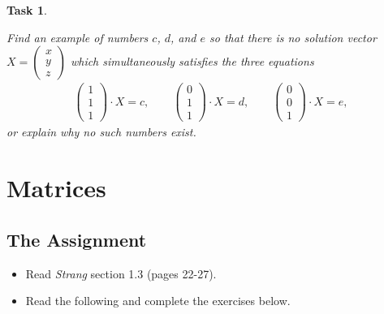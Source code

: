 \documentclass[10pt,]{book}
\theoremstyle{plain}
\numberwithin{equation}{section}
\newtheorem{task}{Task}[chapter]
\begin{document}
\begin{task}
\label{task-22}

        Find an example of numbers \(c\), \(d\), and \(e\) so that there
        is no solution vector \(X = \left(\begin{smallmatrix}x\\y\\z
        \end{smallmatrix}\right)\) which simultaneously satisfies the three
        equations \begin{gather*}
\begin{pmatrix} 1\\1\\1\end{pmatrix}\cdot X = c, \qquad
          \begin{pmatrix} 0\\1\\1\end{pmatrix}\cdot X = d, \qquad
          \begin{pmatrix} 0\\0\\1\end{pmatrix}\cdot X = e,
\end{gather*}
          or explain why no such numbers exist.
      \end{task}
\clearpage
\typeout{************************************************}
\typeout{************************************************}
\section[Matrices]{Matrices}\label{matrices}
\typeout{************************************************}
\typeout{************************************************}
\subsection[The Assignment]{The Assignment}\label{subsection-10}
\begin{itemize}
\item{}Read \emph{Strang} section 1.3 (pages 22-27).\item{}Read the following and complete the exercises below.\end{itemize}
\typeout{************************************************}
\typeout{************************************************}
\end{document}
